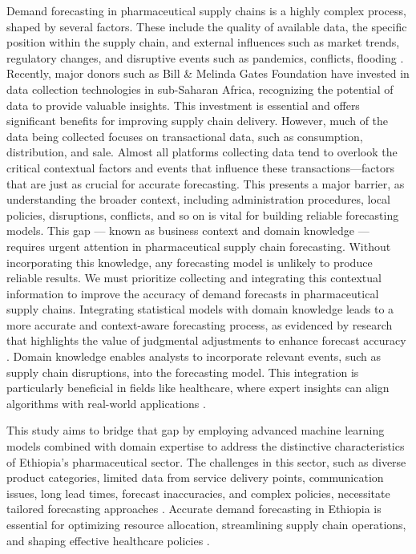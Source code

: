 \documentclass[
  authoryear,
  preprint,
  3p]{elsarticle}
\begin{document}
Demand forecasting in pharmaceutical supply chains is a highly complex
process, shaped by several factors. These include the quality of
available data, the specific position within the supply chain, and
external influences such as market trends, regulatory changes, and
disruptive events such as pandemics, conflicts, flooding
\citep{schneider2010pharmaceutical, hyndman2018forecasting}. Recently,
major donors such as Bill \& Melinda Gates Foundation have invested in
data collection technologies in sub-Saharan Africa, recognizing the
potential of data to provide valuable insights. This investment is
essential and offers significant benefits for improving supply chain
delivery. However, much of the data being collected focuses on
transactional data, such as consumption, distribution, and sale. Almost
all platforms collecting data tend to overlook the critical contextual
factors and events that influence these transactions---factors that are
just as crucial for accurate forecasting. This presents a major barrier,
as understanding the broader context, including administration
procedures, local policies, disruptions, conflicts, and so on is vital
for building reliable forecasting models. This gap --- known as business
context and domain knowledge --- requires urgent attention in
pharmaceutical supply chain forecasting. Without incorporating this
knowledge, any forecasting model is unlikely to produce reliable
results. We must prioritize collecting and integrating this contextual
information to improve the accuracy of demand forecasts in
pharmaceutical supply chains. Integrating statistical models with domain
knowledge leads to a more accurate and context-aware forecasting
process, as evidenced by research that highlights the value of
judgmental adjustments to enhance forecast accuracy
\citep{fildes2007against, taylor2022artificial, soyiri2013overview}.
Domain knowledge enables analysts to incorporate relevant events, such
as supply chain disruptions, into the forecasting model. This
integration is particularly beneficial in fields like healthcare, where
expert insights can align algorithms with real-world applications
\citep{dash2022review}.

This study aims to bridge that gap by employing advanced machine
learning models combined with domain expertise to address the
distinctive characteristics of Ethiopia's pharmaceutical sector. The
challenges in this sector, such as diverse product categories, limited
data from service delivery points, communication issues, long lead
times, forecast inaccuracies, and complex policies, necessitate tailored
forecasting approaches
\citep{bilal2024challenges, boche2022procurement}. Accurate demand
forecasting in Ethiopia is essential for optimizing resource allocation,
streamlining supply chain operations, and shaping effective healthcare
policies \citep{rostami2022forecasting}.
\end{document}
